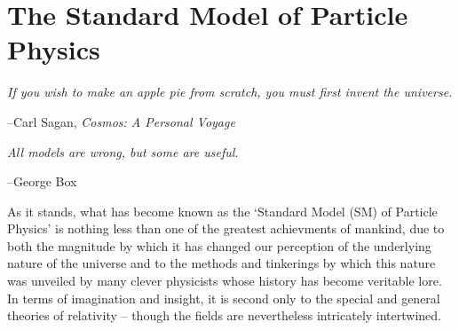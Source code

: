 \chapter{The Standard Model of Particle Physics}

	

\epigraph{\textit{If you wish to make an apple pie from scratch, you must first invent the universe.}}{--Carl Sagan, \textit{Cosmos: A Personal Voyage}}
\epigraph{\textit{All models are wrong, but some are useful.}}{--George Box}


As it stands, what has become known as the `Standard Model (SM) of Particle Physics'
is nothing less than one of the greatest achievments of mankind, due to both
the magnitude by which it has changed our perception of the underlying
nature of the universe and to the methods and tinkerings by which this
nature was unveiled by many clever physicists whose history has become veritable lore.
In terms of imagination and insight, it is second only to the special and general theories of relativity --
though the fields are nevertheless intricately intertwined.

